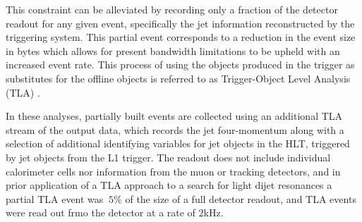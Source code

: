 	This constraint can be alleviated by recording only a fraction of the detector readout for any given event, specifically the jet information reconstructed by the triggering system. This partial event corresponds to a reduction in the event size in bytes which allows for present bandwidth limitations to be upheld with an increased event rate. This process of using the objects produced in the trigger as substitutes for the offline objects is referred to as Trigger-Object Level Analysis (TLA) \cite{tla}.

	In these analyses, partially built events are collected using an additional TLA stream of the output data, which records the jet four-momentum along with a selection of additional identifying variables for jet objects in the HLT, triggered by jet objects from the L1 trigger. The readout does not include individual calorimeter cells nor information from the muon or tracking detectors, and in prior application of a TLA approach to a search for light dijet resonances \cite{tla} a partial TLA event was $~5\%$ of the size of a full detector readout, and TLA events were read out frmo the detector at a rate of $2$kHz.

\endinput
